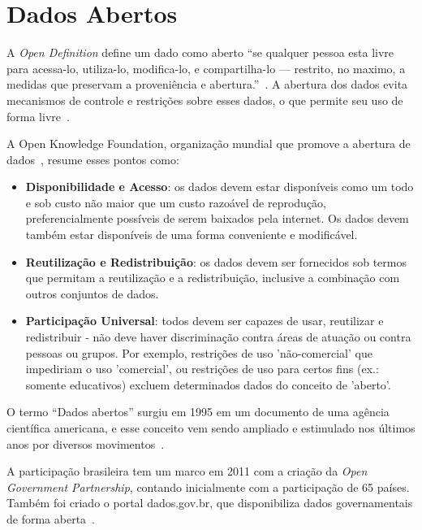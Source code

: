 \chapter{Dados Abertos}

A \emph{Open Definition} define um dado como aberto \enquote{se qualquer pessoa esta livre para acessa-lo, utiliza-lo, modifica-lo, e compartilha-lo — restrito, no maximo, a medidas que preservam a proveniência e abertura.}~\cite{opendefinition}. A abertura dos dados evita mecanismos de controle e restrições sobre esses dados, o que permite seu uso de forma livre~\cite{seijiconectados}.

A Open Knowledge Foundation, organização mundial que promove a abertura de dados~\cite{openknowledge}, resume esses pontos como:

\begin{itemize}
\item \textbf{Disponibilidade e Acesso}: os dados devem estar disponíveis como um todo e sob custo não maior que um custo razoável de reprodução, preferencialmente possíveis de serem baixados pela internet. Os dados devem também estar disponíveis de uma forma conveniente e modificável.

\item \textbf{Reutilização e Redistribuição}: os dados devem ser fornecidos sob termos que permitam a reutilização e a redistribuição, inclusive a combinação com outros conjuntos de dados.

\item \textbf{Participação Universal}: todos devem ser capazes de usar, reutilizar e redistribuir - não deve haver discriminação contra áreas de atuação ou contra pessoas ou grupos. Por exemplo, restrições de uso 'não-comercial' que impediriam o uso 'comercial', ou restrições de uso para certos fins (ex.: somente educativos) excluem determinados dados do conceito de 'aberto'.
\end{itemize}

O termo \enquote{Dados abertos} surgiu em 1995 em um documento de uma agência científica americana, e esse conceito vem sendo ampliado e estimulado nos últimos anos por diversos movimentos~\cite{seijiconectados}. 

A participação brasileira tem um marco em 2011 com a criação da \emph{Open Government Partnership}, contando inicialmente com a participação de 65 países. Também foi criado o portal dados.gov.br, que disponibiliza dados governamentais de forma aberta~\cite{seijiconectados}.


